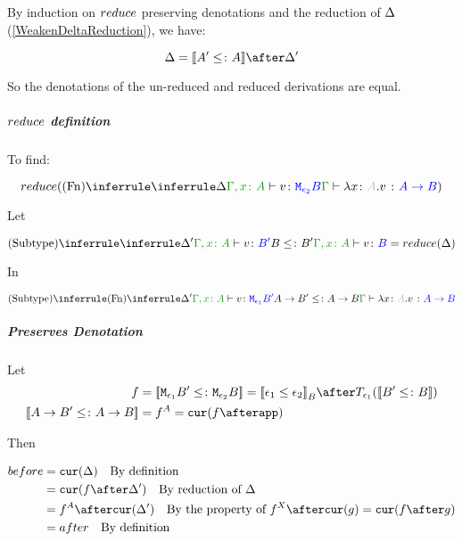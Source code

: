 \documentclass{report}
\begin{document}
        By induction on $reduce$ preserving denotations and the reduction of $\Delta$ (\ref{WeakenDeltaReduction}), we have:

        \begin{equation}
            \D = \deno{A' \subtype A}\after\D'
        \end{equation}

        So the denotations of the un-reduced and reduced derivations are equal.

        \subparagraph{$reduce$ definition}
            To find:
        
            \begin{equation}
                \reduce(\ntreeruleI{Fn}{
                    \treeruleI{\D}{\typerelation{\gax}{v}{\M{\e_2}{B}}}
                }{\gtyperelation{\lam{x}{A}{v}}{\ab}})
            \end{equation}

            Let 

            \begin{equation}
                \ntreeruleII{Subtype}{
                    \treeruleI{\D'}{\typerelation{\gax}{v}{B'}}
                    }{B\subtype B'}{
                    \typerelation{\gax}{v}{B}
                } = \reduce(\D)
            \end{equation}

            In

            \begin{equation}
                \ntreeruleII{Subtype}{
                    \ntreeruleI{Fn}{
                        \D'
                    }{
                        \typerelation{\gax}{v}{\M{\e_1}{B'}}
                    }
                    }{
                    \fntype{A}{B'}\subtype\ab
                } {
                    \gtyperelation{\lam{x}{A}{v}}{\ab}
                }
            \end{equation}

        \subparagraph{Preserves Denotation}
            Let
            \begin{align*}
                f &= \deno{\M{\e_1}{B'}\subtype\M{\e_2}{B}} = \deno{\e_1\subeffect\e_2}_B\after\T{\e_1}{(\deno{B'\subtype B})} \\
                \deno{\fntype{A}{B'}\subtype\ab} & = f^A = \cur{f\after \app}
            \end{align*}

            Then

            \begin{align*}
                before & = \cur{\D} \qt{By definition}\\
                        & = \cur{f\after\D'} \qt{By reduction of $\D$} \\
                        & = f^A\after\cur{\D'}\qt{By the property of $f^X\after\cur{g} = \cur{f\after g}$} \\
                        & = after \qt{By definition}\\
            \end{align*}
\end{document}
